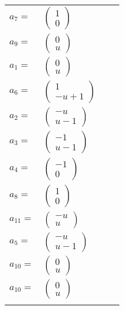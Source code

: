\documentclass[1p]{elsarticle_modified}
\theoremstyle{definition}
\begin{document}
\begin{tabular}{m{7pt} m{180pt} m{7pt} m{180pt} }
\flushright $a_{7}=$&$\begin{pmatrix}1\\0\end{pmatrix}$ \\
\flushright $a_{9}=$&$\begin{pmatrix}0\\u\end{pmatrix}$ \\
\flushright $a_{1}=$&$\begin{pmatrix}0\\u\end{pmatrix}$ \\
\flushright $a_{6}=$&$\begin{pmatrix}1\\- u+1\end{pmatrix}$ \\
\flushright $a_{2}=$&$\begin{pmatrix}- u\\u-1\end{pmatrix}$ \\
\flushright $a_{3}=$&$\begin{pmatrix}-1\\u-1\end{pmatrix}$ \\
\flushright $a_{4}=$&$\begin{pmatrix}-1\\0\end{pmatrix}$ \\
\flushright $a_{8}=$&$\begin{pmatrix}1\\0\end{pmatrix}$ \\
\flushright $a_{11}=$&$\begin{pmatrix}- u\\u\end{pmatrix}$ \\
\flushright $a_{5}=$&$\begin{pmatrix}- u\\u-1\end{pmatrix}$ \\
\flushright $a_{10}=$&$\begin{pmatrix}0\\u\end{pmatrix}$\\ \flushright $a_{10}=$&$\begin{pmatrix}0\\u\end{pmatrix}$\\&\end{tabular}
\end{document}
